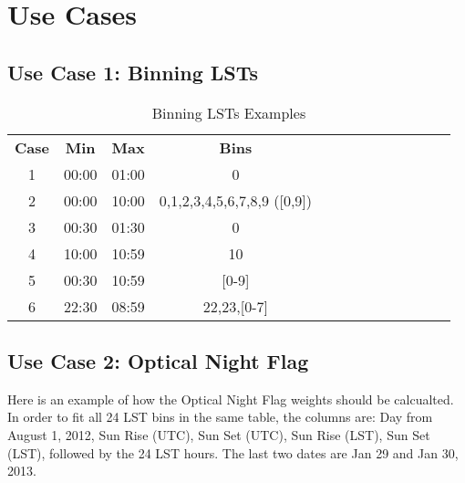 \documentclass{article}
\begin{document}
\section{Use Cases}

\subsection{Use Case 1: Binning LSTs}



\begin{table}
{\footnotesize
\caption{Binning LSTs Examples \label{tab:time}}
\begin{tabular*}{1.05\textwidth}{@{\extracolsep{\fill}}ccccccccccccc}
\hline \hline
{\bf Case} & {\bf Min} & {\bf Max} & {\bf Bins}\\
1 & 00:00 & 01:00 & 0\\
2 &	00:00 & 10:00 &	0,1,2,3,4,5,6,7,8,9 ([0,9])\\
3 &	00:30 &	01:30 &	0\\
4 &	10:00 & 10:59 &	10\\
5 &	00:30 &	10:59 &	[0-9]\\
6 &	22:30 &	08:59 &	22,23,[0-7]\\
\hline
\hline \hline
\end{tabular*}
}
\end{table}

\subsection{Use Case 2: Optical Night Flag}

Here is an example of how the Optical Night Flag weights should be calcualted.  In order to fit all 24 LST bins in the same table, the columns are: Day from August 1, 2012, Sun Rise (UTC), Sun Set (UTC), Sun Rise (LST), Sun Set (LST), followed by the 24 LST hours.   The last two dates are Jan 29 and Jan 30, 2013.
\end{document}
